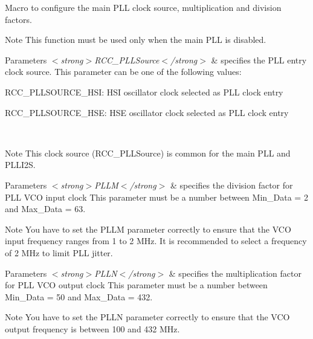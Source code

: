 Macro to configure the main P\+LL clock source, multiplication and division factors. 

\begin{DoxyNote}{Note}
This function must be used only when the main P\+LL is disabled. 
\end{DoxyNote}

\begin{DoxyParams}{Parameters}
{\em $<$strong$>$\+R\+C\+C\+\_\+\+P\+L\+L\+Source$<$/strong$>$} & specifies the P\+LL entry clock source. This parameter can be one of the following values\+: \begin{DoxyItemize}
\item R\+C\+C\+\_\+\+P\+L\+L\+S\+O\+U\+R\+C\+E\+\_\+\+H\+SI\+: H\+SI oscillator clock selected as P\+LL clock entry \item R\+C\+C\+\_\+\+P\+L\+L\+S\+O\+U\+R\+C\+E\+\_\+\+H\+SE\+: H\+SE oscillator clock selected as P\+LL clock entry \end{DoxyItemize}
\\
\hline
\end{DoxyParams}
\begin{DoxyNote}{Note}
This clock source (R\+C\+C\+\_\+\+P\+L\+L\+Source) is common for the main P\+LL and P\+L\+L\+I2S. 
\end{DoxyNote}

\begin{DoxyParams}{Parameters}
{\em $<$strong$>$\+P\+L\+L\+M$<$/strong$>$} & specifies the division factor for P\+LL V\+CO input clock This parameter must be a number between Min\+\_\+\+Data = 2 and Max\+\_\+\+Data = 63. \\
\hline
\end{DoxyParams}
\begin{DoxyNote}{Note}
You have to set the P\+L\+LM parameter correctly to ensure that the V\+CO input frequency ranges from 1 to 2 M\+Hz. It is recommended to select a frequency of 2 M\+Hz to limit P\+LL jitter. 
\end{DoxyNote}

\begin{DoxyParams}{Parameters}
{\em $<$strong$>$\+P\+L\+L\+N$<$/strong$>$} & specifies the multiplication factor for P\+LL V\+CO output clock This parameter must be a number between Min\+\_\+\+Data = 50 and Max\+\_\+\+Data = 432. \\
\hline
\end{DoxyParams}
\begin{DoxyNote}{Note}
You have to set the P\+L\+LN parameter correctly to ensure that the V\+CO output frequency is between 100 and 432 M\+Hz. 
\end{DoxyNote}

